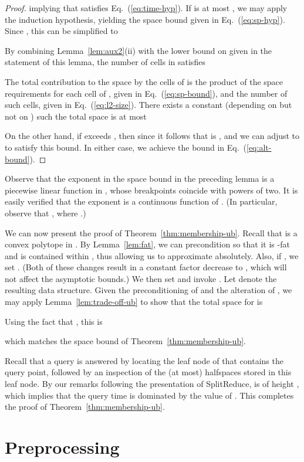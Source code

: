 \documentclass[11pt]{article}   \usepackage[letterpaper,hmargin=2.1cm,vmargin=3cm]{geometry}
\newcommand{\alg}{\textrm{SplitReduce}}
\begin{document}
\begin{proof}
implying that  satisfies Eq.~(\ref{eq:time-hyp}). If  is at most , we may apply the induction hypothesis, yielding the space bound given in Eq.~(\ref{eq:sp-hyp}). Since , this can be simplified to


By combining Lemma~\ref{lem:aux2}(ii) with the lower bound on  given in the statement of this lemma, the number of cells in  satisfies

The total contribution to the space by the cells of  is the product of the space requirements for each cell of , given in Eq.~(\ref{eq:sp-bound}), and the number of such cells, given in Eq.~(\ref{eq:l2-size}). There exists a constant  (depending on  but not on ) such the total space is at most

On the other hand, if  exceeds , then since  it follows that  is , and we can adjust to  to satisfy this bound. In either case, we achieve the bound in Eq.~(\ref{eq:alt-bound}). 
\end{proof}


Observe that the exponent in the space bound in the preceding lemma is a piecewise linear function in , whose breakpoints coincide with powers of two. It is easily verified that the exponent is a continuous function of . (In particular, observe that , where .)

\medskip

We can now present the proof of Theorem~\ref{thm:membership-ub}. Recall that  is a convex polytope in . By Lemma~\ref{lem:fat}, we can precondition  so that it is -fat and is contained within , thus allowing us to approximate  absolutely. Also, if , we set . (Both of these changes result in a constant factor decrease to , which will not affect the asymptotic bounds.) We then set  and invoke . Let  denote the resulting data structure. Given the preconditioning of  and the alteration of , we may apply Lemma~\ref{lem:trade-off-ub} to show that the total space for  is 

Using the fact that , this is

which matches the space bound of Theorem~\ref{thm:membership-ub}.

Recall that a query is answered by locating the leaf node of  that contains the query point, followed by an inspection of the (at most)  halfspaces stored in this leaf node. By our remarks following the presentation of {\alg},  is of height , which implies that the query time is dominated by the value of . This completes the proof of Theorem~\ref{thm:membership-ub}.

\section{Preprocessing} \label{sec:preproc}
\end{document}

